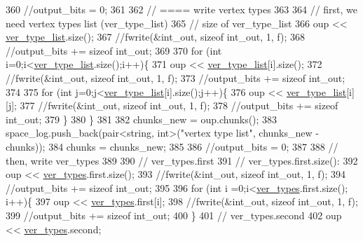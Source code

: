 \begin{DoxyCode}
360   \textcolor{comment}{//output\_bits = 0;}
361   
362   \textcolor{comment}{// ==== write vertex types}
363 
364   \textcolor{comment}{// first, we need vertex types list (ver\_type\_list)}
365   \textcolor{comment}{// size of ver\_type\_list}
366   oup <<  \hyperlink{classmarked__graph__compressed_af2e3e55223d436628a02758dfae88493}{ver\_type\_list}.size();
367   \textcolor{comment}{//fwrite(&int\_out, sizeof int\_out, 1, f);}
368   \textcolor{comment}{//output\_bits += sizeof int\_out;}
369 
370   \textcolor{keywordflow}{for} (\textcolor{keywordtype}{int} i=0;i<\hyperlink{classmarked__graph__compressed_af2e3e55223d436628a02758dfae88493}{ver\_type\_list}.size();i++)\{
371     oup << \hyperlink{classmarked__graph__compressed_af2e3e55223d436628a02758dfae88493}{ver\_type\_list}[i].size();
372     \textcolor{comment}{//fwrite(&int\_out, sizeof int\_out, 1, f);}
373     \textcolor{comment}{//output\_bits += sizeof int\_out;}
374 
375     \textcolor{keywordflow}{for} (\textcolor{keywordtype}{int} j=0;j<\hyperlink{classmarked__graph__compressed_af2e3e55223d436628a02758dfae88493}{ver\_type\_list}[i].size();j++)\{
376       oup << \hyperlink{classmarked__graph__compressed_af2e3e55223d436628a02758dfae88493}{ver\_type\_list}[i][j];
377       \textcolor{comment}{//fwrite(&int\_out, sizeof int\_out, 1, f);}
378       \textcolor{comment}{//output\_bits += sizeof int\_out;}
379     \}
380   \}
381 
382   chunks\_new = oup.chunks();
383   space\_log.push\_back(pair<string, int>(\textcolor{stringliteral}{"vertex type list"}, chunks\_new - chunks));
384   chunks = chunks\_new;
385 
386   \textcolor{comment}{//output\_bits = 0;}
387   
388   \textcolor{comment}{// then, write ver\_types}
389 
390   \textcolor{comment}{// ver\_types.first}
391   \textcolor{comment}{// ver\_types.first.size():}
392   oup << \hyperlink{classmarked__graph__compressed_af446cc5e23c241a92b76642fd5ebc403}{ver\_types}.first.size();
393   \textcolor{comment}{//fwrite(&int\_out, sizeof int\_out, 1, f);}
394   \textcolor{comment}{//output\_bits += sizeof int\_out;}
395 
396   \textcolor{keywordflow}{for} (\textcolor{keywordtype}{int} i =0;i<\hyperlink{classmarked__graph__compressed_af446cc5e23c241a92b76642fd5ebc403}{ver\_types}.first.size(); i++)\{
397     oup <<  \hyperlink{classmarked__graph__compressed_af446cc5e23c241a92b76642fd5ebc403}{ver\_types}.first[i];
398     \textcolor{comment}{//fwrite(&int\_out, sizeof int\_out, 1, f);}
399     \textcolor{comment}{//output\_bits += sizeof int\_out;}
400   \}
401   \textcolor{comment}{// ver\_types.second}
402   oup << \hyperlink{classmarked__graph__compressed_af446cc5e23c241a92b76642fd5ebc403}{ver\_types}.second;

\end{DoxyCode}

